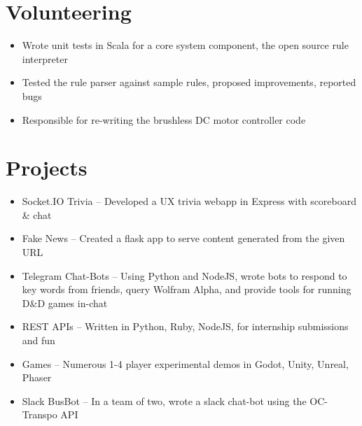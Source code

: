 \documentclass[]{rcf_cv}
\begin{document}
	\section{Volunteering}
	
		\begin{itemize}
			\setlength\itemsep{-0.4em}
			\renewcommand\labelitemi{--}
			
			\item Wrote unit tests in Scala for a core system component, the open source rule interpreter
			\item Tested the rule parser against sample rules, proposed improvements, reported bugs

		\end{itemize}

	
		\begin{itemize}
			\setlength\itemsep{-0.4em}
			\renewcommand\labelitemi{--}
			
			\item Responsible for re-writing the brushless DC motor controller code
			
		\end{itemize}

	
	\section{Projects}
		\begin{itemize}
			\setlength\itemsep{-0.4em}
			\renewcommand\labelitemi{--}
			
			
			\item Socket.IO Trivia -- Developed a UX trivia webapp in Express with scoreboard \& chat
			
			\item Fake News -- Created a flask app to serve content generated from the given URL
			
			\item Telegram Chat-Bots -- Using Python and NodeJS, wrote bots to respond to key words from friends, query Wolfram Alpha, and provide tools for running D\&D games in-chat
			
			\item REST APIs -- Written in Python, Ruby, NodeJS, for internship submissions and fun
			
			\item Games -- Numerous 1-4 player experimental demos in Godot, Unity, Unreal, Phaser
			
			\item Slack BusBot -- In a team of two, wrote a slack chat-bot using the OC-Transpo API
			
		\end{itemize}
\end{document}
